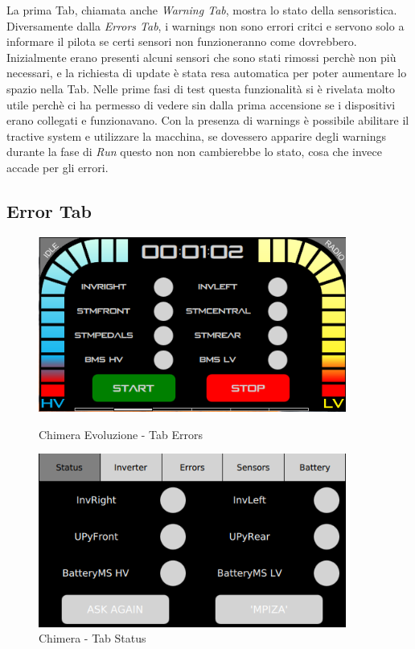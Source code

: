 La prima Tab, chiamata anche \emph{Warning Tab}, mostra lo stato della sensoristica.
Diversamente dalla \emph{Errors Tab}, i warnings non sono errori critci e servono 
solo a informare il pilota se certi sensori non funzioneranno come dovrebbero.
Inizialmente erano presenti alcuni sensori che sono stati rimossi perchè non più necessari,
e la richiesta di update è stata resa automatica per poter aumentare lo spazio nella Tab.  
Nelle prime fasi di test questa funzionalità si è rivelata molto utile perchè ci ha permesso
di vedere sin dalla prima accensione se i dispositivi erano collegati e funzionavano.
Con la presenza di warnings è possibile abilitare il tractive system e utilizzare la macchina, 
se dovessero apparire degli warnings durante la fase di \emph{Run} questo non non cambierebbe lo stato,
cosa che invece accade per gli errori.

\subsection{Error Tab}

\begin{figure}[h!]
    \centering
    \begin{minipage}{0.5\textwidth}
        \centering
        \includegraphics[width=0.9\textwidth]{./figures/UI/tabErrors.png}
        \caption{Chimera Evoluzione - Tab Errors}    
    \end{minipage}\hfill
    \begin{minipage}{0.5\textwidth}
        \centering
        \includegraphics[width=0.9\textwidth]{./figures/oldUI/tabStatus.png}
        \caption{Chimera - Tab Status}
    \end{minipage}
\end{figure}

